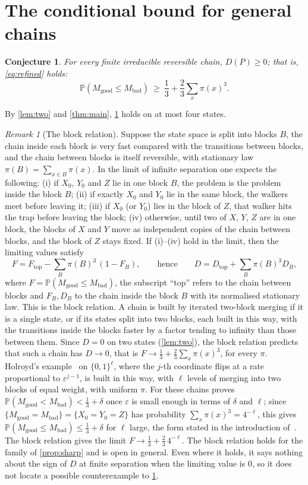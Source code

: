 \documentclass[11pt,a4paper]{article}
\numberwithin{equation}{section}
\newtheorem{conjecture}[theorem]{Conjecture}
\theoremstyle{remark}
\newtheorem{remark}[theorem]{Remark}
\newcommand{\Pp}{\mathbb P}
\newcommand{\eps}{\varepsilon}
\newcommand{\good}{M_{\mathrm{good}}}
\newcommand{\bad}{M_{\mathrm{bad}}}
\begin{document}
\section{The conditional bound for general chains}\label{sec:remarks}

\begin{conjecture}\label{conj:refined}
For every finite irreducible reversible chain, $D(P)\ge0$; that is, \eqref{eq:refined} holds:
\[
\Pp(\good\le\bad)\ \ge\ \frac13+\frac23\sum_x\pi(x)^3 .
\]
\end{conjecture}

By \cref{lem:two} and \cref{thm:main}, \cref{conj:refined} holds on at most four states.

\begin{remark}[The block relation]\label{rem:scales}
Suppose the state space is split into blocks $B$, the chain inside each block is very fast compared with the transitions between blocks, and the chain between blocks is itself reversible, with stationary law $\pi(B)=\sum_{x\in B}\pi(x)$. In the limit of infinite separation one expects the following:
(i) if $X_0$, $Y_0$ and $Z$ lie in one block $B$, the problem is the problem inside the block $B$;
(ii) if exactly $X_0$ and $Y_0$ lie in the same block, the walkers meet before leaving it;
(iii) if $X_0$ (or $Y_0$) lies in the block of $Z$, that walker hits the trap before leaving the block;
(iv) otherwise, until two of $X$, $Y$, $Z$ are in one block, the blocks of $X$ and $Y$ move as independent copies of the chain between blocks, and the block of $Z$ stays fixed.
If (i)--(iv) hold in the limit, then the limiting values satisfy
\[
F=F_{\mathrm{top}}-\sum_B\pi(B)^3\,(1-F_B),\qquad\text{hence}\qquad D=D_{\mathrm{top}}+\sum_B\pi(B)^3D_B,
\]
where $F=\Pp(\good\le\bad)$, the subscript ``top'' refers to the chain between blocks and $F_B,D_B$ to the chain inside the block $B$ with its normalised stationary law. This is the block relation. A chain is built by iterated two-block merging if it is a single state, or if its states split into two blocks, each built in this way, with the transitions inside the blocks faster by a factor tending to infinity than those between them. Since $D=0$ on two states (\cref{lem:two}), the block relation predicts that such a chain has $D\to0$, that is $F\to\tfrac13+\tfrac23\sum_x\pi(x)^3$, for every $\pi$. Holroyd's example~\cite[Section~6]{ABOPS} on $\{0,1\}^\ell$, where the $j$-th coordinate flips at a rate proportional to $\eps^{j-1}$, is built in this way, with $\ell$ levels of merging into two blocks of equal weight, with uniform $\pi$. For these chains \cite[Section~6]{ABOPS} proves $\Pp(\good<\bad)<\tfrac13+\delta$ once $\eps$ is small enough in terms of $\delta$ and $\ell$; since $\{\good=\bad\}=\{X_0=Y_0=Z\}$ has probability $\sum_x\pi(x)^3=4^{-\ell}$, this gives $\Pp(\good\le\bad)\le\tfrac13+\delta$ for $\ell$ large, the form stated in the introduction of~\cite{ABOPS}. The block relation gives the limit $F\to\tfrac13+\tfrac23\,4^{-\ell}$. The block relation holds for the family of \cref{prop:sharp} and is open in general. Even where it holds, it says nothing about the sign of $D$ at finite separation when the limiting value is $0$, so it does not locate a possible counterexample to \cref{conj:refined}.
\end{remark}
\end{document}
